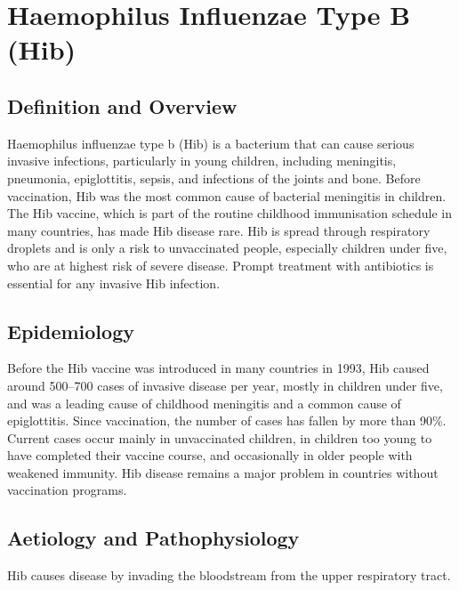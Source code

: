 \chapter{Haemophilus Influenzae Type B (Hib)}

\section*{Definition and Overview}
Haemophilus influenzae type b (Hib) is a bacterium that can cause serious invasive infections, particularly in young children, including meningitis, pneumonia, epiglottitis, sepsis, and infections of the joints and bone. Before vaccination, Hib was the most common cause of bacterial meningitis in children. The Hib vaccine, which is part of the routine childhood immunisation schedule in many countries, has made Hib disease rare. Hib is spread through respiratory droplets and is only a risk to unvaccinated people, especially children under five, who are at highest risk of severe disease. Prompt treatment with antibiotics is essential for any invasive Hib infection.

\section*{Epidemiology}
Before the Hib vaccine was introduced in many countries in 1993, Hib caused around 500--700 cases of invasive disease per year, mostly in children under five, and was a leading cause of childhood meningitis and a common cause of epiglottitis. Since vaccination, the number of cases has fallen by more than 90\%. Current cases occur mainly in unvaccinated children, in children too young to have completed their vaccine course, and occasionally in older people with weakened immunity. Hib disease remains a major problem in countries without vaccination programs.

\section*{Aetiology and Pathophysiology}
Hib causes disease by invading the bloodstream from the upper respiratory tract.

